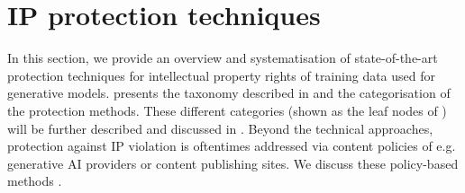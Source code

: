\documentclass[conference,table]{IEEEtran} %
\begin{document}


\section{IP protection techniques}\label{sec:mitigation}
In this section, we provide an overview and systematisation of state-of-the-art protection techniques for intellectual property rights of training data used for generative models.
 presents the taxonomy described in  and the categorisation of the protection methods.
These different categories (shown as the leaf nodes of ) will be further described and discussed in .
Beyond the technical approaches, protection against IP violation is oftentimes addressed via content policies of e.g. generative AI providers or content publishing sites. 
We discuss these policy-based methods .
\end{document}
